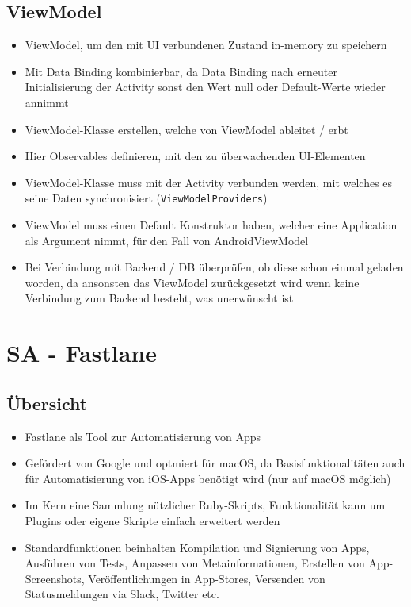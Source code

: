 \documentclass[a4paper]{article}
\begin{document}
		\subsection{ViewModel}
		
		\begin{itemize}
			\item ViewModel, um den mit UI verbundenen Zustand in-memory zu speichern
			\item Mit Data Binding kombinierbar, da Data Binding nach erneuter Initialisierung der Activity sonst den Wert null oder Default-Werte wieder annimmt
			\item ViewModel-Klasse erstellen, welche von ViewModel ableitet / erbt
			\item Hier Observables definieren, mit den zu überwachenden UI-Elementen
			\item ViewModel-Klasse muss mit der Activity verbunden werden, mit welches es seine Daten synchronisiert (\texttt{ViewModelProviders})
			\item ViewModel muss einen Default Konstruktor haben, welcher eine Application als Argument nimmt, für den Fall von AndroidViewModel
			\item Bei Verbindung mit Backend / DB überprüfen, ob diese schon einmal geladen worden, da ansonsten das ViewModel zurückgesetzt wird wenn keine Verbindung zum Backend besteht, was unerwünscht ist
		\end{itemize}
		
	
	\section{SA - Fastlane}
	\label{section:fastlane}
	
		\subsection{Übersicht}
		
		\begin{itemize}
			\item Fastlane als Tool zur Automatisierung von Apps
			\item Gefördert von Google und optmiert für macOS, da Basisfunktionalitäten auch für Automatisierung von iOS-Apps benötigt wird (nur auf macOS möglich)
			\item Im Kern eine Sammlung nützlicher Ruby-Skripts, Funktionalität kann um Plugins oder eigene Skripte einfach erweitert werden
			\item Standardfunktionen beinhalten Kompilation und Signierung von Apps, Ausführen von Tests, Anpassen von Metainformationen, Erstellen von App-Screenshots, Veröffentlichungen in App-Stores, Versenden von Statusmeldungen via Slack, Twitter etc.
		\end{itemize}
	
\end{document}
